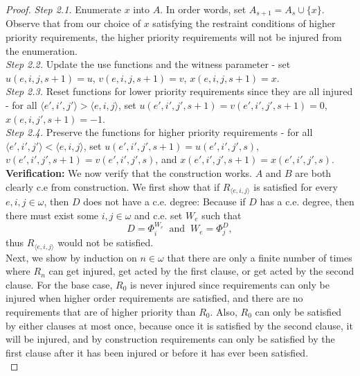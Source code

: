 \documentclass{article}
\begin{document}
\begin{proof}
    \textit{Step 2.1.} Enumerate $x$ into $A$. In order words, set
    $A_{s+1}=A_s\cup\{x\}$. Observe that from our choice of $x$
    satisfying the restraint conditions of higher priority
    requirements, the higher priority requirements will not be injured
    from the enumeration. \\

    \textit{Step 2.2.} Update the use functions and the witness parameter -
    set $u(e,i,j,s+1)=u$, $v(e,i,j,s+1)=v$, $x(e,i,j,s+1)=x$. \\

    \textit{Step 2.3.} Reset functions for lower priority requirements
    since they are all injured - for all $\langle e',i',j'\rangle >\langle
    e,i,j\rangle$, set $u(e',i',j',s+1)=v(e',i',j',s+1)=0$,
    $x(e,i,j',s+1)=-1$. \\

    \textit{Step 2.4.} Preserve the functions for higher
    priority requirements - for all $\langle e',i',j'\rangle <\langle
    e,i,j\rangle$, set $u(e',i',j',s+1)=u(e',i',j',s)$,
    $v(e',i',j',s+1)=v(e',i',j',s)$, and $x(e',i',j',s+1)=x(e',i',j',s)$.
    \\

    \textbf{Verification:} We now verify that the construction works.
    $A$ and $B$ are both clearly c.e from construction. We first show that
    if $R_{\langle e,i,j\rangle}$ is satisfied for every $e,i,j\in\omega$,
    then $D$ does not have a c.e. degree: Because if $D$ has a c.e. degree,
    then there must exist some $i,j\in\omega$ and c.e. set $W_e$ such that
    \[D=\Phi_i^{W_e}\;\; \text{and}\;\; W_e=\Phi_j^D,\]
    thus $R_{\langle e,i,j\rangle}$ would not be satisfied. \\

    Next, we show by induction on $n\in\omega$ that there are only a finite
    number of times where $R_n$ can get injured, get acted by the first
    clause, or get acted by the second clause. For the base case, $R_0$ is
    never injured since requirements can only be injured when higher order
    requirements are satisfied, and there are no requirements that are of
    higher priority than $R_0$. Also, $R_0$ can only be satisfied by either
    clauses at most once, because once it is satisfied by the second
    clause, it will be injured, and by construction requirements can only
    be satisfied by the first clause after it has been injured or before it
    has ever been satisfied. \\


\end{proof}
\end{document}
